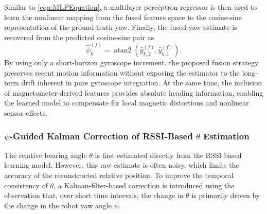\documentclass[subscriptcorrection,upint,varvw,barcolor=Goldenrod3,mathalfa=cal=euler,balance,hyphenate,pdf-a]{asmejour}
\begin{document}
Similar to \ref{eqn:MLPEquation}, a multilayer perceptron regressor is then used to learn the nonlinear mapping from the fused feature space to the cosine-sine representation of the ground-truth yaw. Finally, the fused yaw estimate is recovered from the predicted cosine-sine pair as
\begin{equation}
\hat{\psi}_k^{(f)} =
\operatorname{atan2}\!\left(\hat{y}^{(f)}_{k,2}, \hat{y}^{(f)}_{k,1}\right).
\end{equation}
By using only a short-horizon gyroscope increment, the proposed fusion strategy preserves recent motion information without exposing the estimator to the long-term drift inherent in pure gyroscope integration. At the same time, the inclusion of magnetometer-derived features provides absolute heading information, enabling the learned model to compensate for local magnetic distortions and nonlinear sensor effects.

\subsubsection{\texorpdfstring{\(\psi\)-Guided Kalman Correction of RSSI-Based \(\theta\) Estimation}{Psi-Guided Kalman Correction of RSSI-Based Theta Estimation}}
The relative bearing angle \(\theta\) is first estimated directly from the RSSI-based learning model. However, this raw estimate is often noisy, which limits the accuracy of the reconstructed relative position. To improve the temporal consistency of \(\theta\), a Kalman-filter-based correction is introduced using the observation that, over short time intervals, the change in \(\theta\) is primarily driven by the change in the robot yaw angle \(\psi\).
\end{document}
